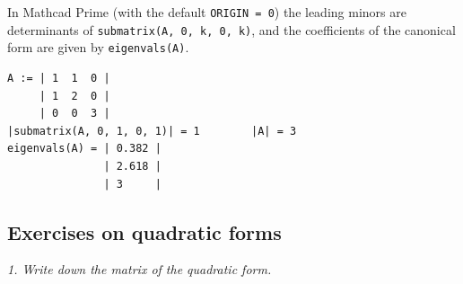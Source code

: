 In Mathcad Prime (with the default \texttt{ORIGIN = 0}) the leading
minors are determinants of \texttt{submatrix(A, 0, k, 0, k)}, and the
coefficients of the canonical form are given by \texttt{eigenvals(A)}.
\begin{Verbatim}[fontsize=\footnotesize,frame=single,label={\small Mathcad}]
A := | 1  1  0 |
     | 1  2  0 |
     | 0  0  3 |
|submatrix(A, 0, 1, 0, 1)| = 1        |A| = 3
eigenvals(A) = | 0.382 |
               | 2.618 |
               | 3     |
\end{Verbatim}

\subsection{Exercises on quadratic forms}

\emph{1. Write down the matrix of the quadratic form.}
\bigskip

